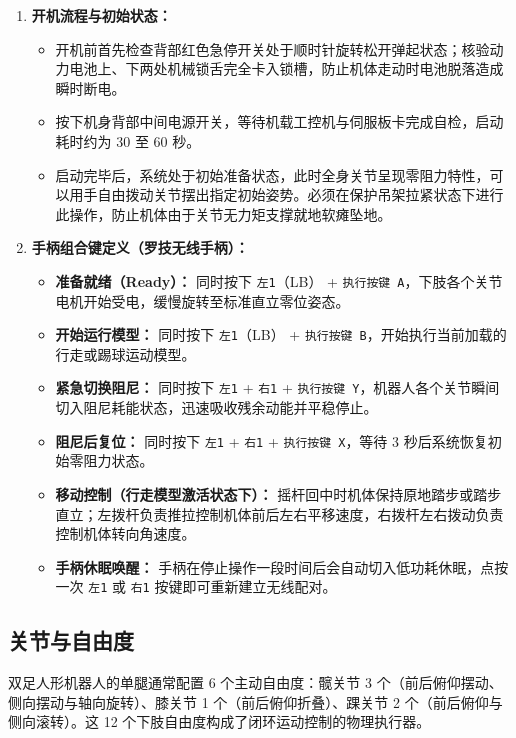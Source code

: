 \begin{enumerate}[leftmargin=*]
    \item \textbf{开机流程与初始状态：}
    \begin{itemize}
        \item 开机前首先检查背部红色急停开关处于顺时针旋转松开弹起状态；核验动力电池上、下两处机械锁舌完全卡入锁槽，防止机体走动时电池脱落造成瞬时断电。
        \item 按下机身背部中间电源开关，等待机载工控机与伺服板卡完成自检，启动耗时约为 30 至 60 秒。
        \item 启动完毕后，系统处于初始准备状态，此时全身关节呈现零阻力特性，可以用手自由拨动关节摆出指定初始姿势。必须在保护吊架拉紧状态下进行此操作，防止机体由于关节无力矩支撑就地软瘫坠地。
    \end{itemize}
    \item \textbf{手柄组合键定义（罗技无线手柄）：}
    \begin{itemize}
        \item \textbf{准备就绪（Ready）：} 同时按下 \texttt{左1}（LB） + \texttt{执行按键 A}，下肢各个关节电机开始受电，缓慢旋转至标准直立零位姿态。
        \item \textbf{开始运行模型：} 同时按下 \texttt{左1}（LB） + \texttt{执行按键 B}，开始执行当前加载的行走或踢球运动模型。
        \item \textbf{紧急切换阻尼：} 同时按下 \texttt{左1} + \texttt{右1} + \texttt{执行按键 Y}，机器人各个关节瞬间切入阻尼耗能状态，迅速吸收残余动能并平稳停止。
        \item \textbf{阻尼后复位：} 同时按下 \texttt{左1} + \texttt{右1} + \texttt{执行按键 X}，等待 3 秒后系统恢复初始零阻力状态。
        \item \textbf{移动控制（行走模型激活状态下）：} 摇杆回中时机体保持原地踏步或踏步直立；左拨杆负责推拉控制机体前后左右平移速度，右拨杆左右拨动负责控制机体转向角速度。
        \item \textbf{手柄休眠唤醒：} 手柄在停止操作一段时间后会自动切入低功耗休眠，点按一次 \texttt{左1} 或 \texttt{右1} 按键即可重新建立无线配对。
    \end{itemize}
\end{enumerate}

\subsection{关节与自由度}

双足人形机器人的单腿通常配置 6 个主动自由度：髋关节 3 个（前后俯仰摆动、侧向摆动与轴向旋转）、膝关节 1 个（前后俯仰折叠）、踝关节 2 个（前后俯仰与侧向滚转）。这 12 个下肢自由度构成了闭环运动控制的物理执行器。

